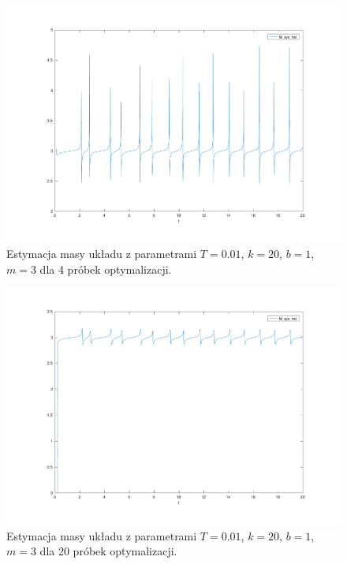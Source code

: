 \documentclass[a4paper, 10pt]{article}
\begin{document}
\begin{figure}[H]
	\includegraphics[width=0.99\linewidth]{system4_mass}
	\centering
	\caption{Estymacja masy układu z parametrami $T=0.01$, $k = 20$, $b = 1$, $m = 3$ dla 4 próbek optymalizacji. }
	\label{fig:system4_mass}
\end{figure}

\begin{figure}[H]
	\includegraphics[width=0.99\linewidth]{system20_mass}
	\centering
	\caption{Estymacja masy układu z parametrami $T=0.01$, $k = 20$, $b = 1$, $m = 3$ dla 20 próbek optymalizacji.}
	\label{fig:system20_mass}
\end{figure}
\end{document}
